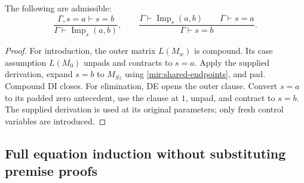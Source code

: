\begin{lemma}\label{mir:shared-implication}
The following are admissible:
\[
 \frac{\Gamma,s=a\vdash s=b}
      {\Gamma\vdash\operatorname{Imp}_s(a,b)},
 \qquad
 \frac{\Gamma\vdash\operatorname{Imp}_s(a,b)\qquad\Gamma\vdash s=a}
      {\Gamma\vdash s=b}.
\]
\end{lemma}
\begin{proof}
For introduction, the outer matrix $L(M_w)$ is compound. Its case
assumption $L(M_0)$ unpads and contracts to $s=a$. Apply the supplied
derivation, expand $s=b$ to $M_{Sz}$ using
\eqref{mir:shared-endpoints}, and pad. Compound DI closes. For
elimination, DE opens the outer clause. Convert $s=a$ to its padded
zero antecedent, use the clause at $1$, unpad, and contract to $s=b$.
The supplied derivation is used at its original parameters; only fresh
control variables are introduced.
\end{proof}

\subsection{Full equation induction without substituting premise proofs}

